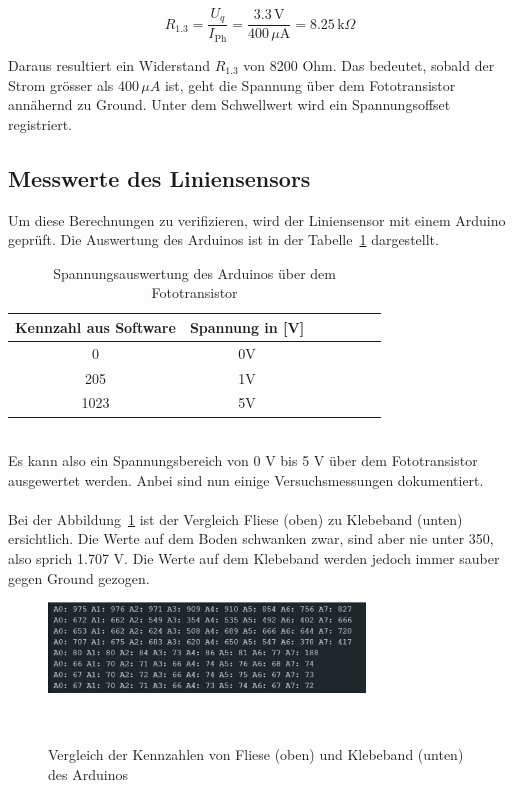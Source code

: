 \documentclass[main.tex]{subfiles} %
\begin{document}
\[
    R_{1.3} = \frac{U_q}{I_{\text{Ph}}} = \frac{3.3 \, \text{V}}{400 \, \mu \text{A}} = 8.25 \, \text{k}\Omega
\]


Daraus resultiert ein Widerstand $R_{1.3}$ von 8200 Ohm. Das bedeutet, sobald der Strom grösser als $400 \, \mu A$ ist, geht die Spannung über dem
Fototransistor annähernd zu Ground. Unter dem Schwellwert wird ein Spannungsoffset registriert.

\subsection*{Messwerte des Liniensensors}
Um diese Berechnungen zu verifizieren, wird der Liniensensor mit
einem Arduino geprüft. Die Auswertung des Arduinos ist in der Tabelle~\ref{tab:Spannungsauswertung_Arduino} dargestellt.
\begin{table}[h]                                    
    \centering
    \begin{tabular}{|c|c|c|c|c|c|c|}                        
        \hline
        \textbf{Kennzahl aus Software} & \textbf{Spannung in [V]}        \\ \hline
        0                      & 0V                                     \\ \hline
        205                    & 1V                                     \\ \hline
        1023                   & 5V                                     \\ \hline

        \end{tabular}
\caption{Spannungsauswertung des Arduinos über dem Fototransistor}
\label{tab:Spannungsauswertung_Arduino}
\end{table}\\

Es kann also ein Spannungsbereich von 0 V bis 5 V über dem Fototransistor ausgewertet werden. Anbei sind nun einige Versuchsmessungen dokumentiert.\\\\


Bei der Abbildung~\ref{fig:Auswertung_Klebeband_zu_Fuge} ist der Vergleich Fliese (oben) zu Klebeband (unten) ersichtlich. Die Werte auf dem Boden schwanken zwar, 
sind aber nie unter 350, also sprich 1.707 V. Die Werte auf dem Klebeband werden jedoch immer sauber gegen Ground gezogen.

\begin{figure}[h!]
    \centering
    \includegraphics[width=0.75\textwidth]{./fig_Liniensensor/Auswertung_Klebeband_zu_Fuge}
    \caption{Vergleich der Kennzahlen von Fliese (oben) und Klebeband (unten) des Arduinos}~\label{fig:Auswertung_Klebeband_zu_Fuge}
\end{figure}
\end{document}
